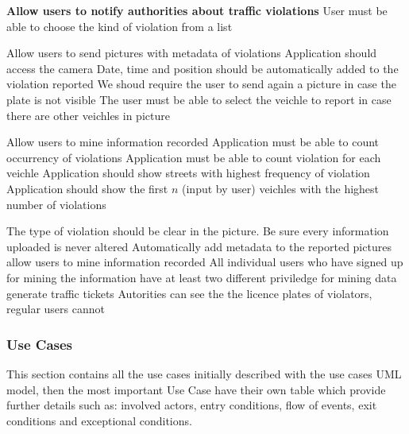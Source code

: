 \begin{enumerate}

   \textbf{Allow users to notify authorities about traffic violations} %
   User must be able to choose the kind of violation from a list



   Allow users to send pictures with metadata of violations %
   Application should access the camera
   Date, time and position should be automatically added to the violation reported
  \req{}  We shoud require the user to send again a picture in case the plate is not visible
  \req{}  The user must be able to select the veichle to report in case there are other veichles in picture

   Allow users to mine information recorded  %
   Application must be able to count occurrency of violations
    Application must be able to count violation for each veichle
   Application should show streets with highest frequency of violation
  \req {}  Application should show the first $n$ (input by user) veichles with the highest number of violations




   The type of violation should be clear in the picture.
   Be sure every information uploaded is never altered
   Automatically add metadata to the reported pictures
   allow users to mine information recorded
  \req{} All individual users who have signed up for mining the information
  \goal{} have at least two different  priviledge for mining data
   generate traffic tickets
   Autorities can see the the licence plates of violators, regular users cannot



\subsubsection{Use Cases}
This section contains all the use cases initially described with the use cases UML model, then the most important Use Case have their own table which provide further details such as:  involved actors, entry conditions,  ﬂow of events, exit conditions and exceptional conditions.






\end{enumerate}
